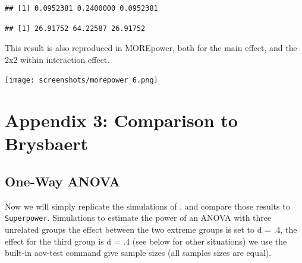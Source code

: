 \documentclass[
]{book}
\newenvironment{Shaded}{\begin{snugshade}}{\end{snugshade}}
\newcommand{\NormalTok}[1]{#1}
\newcommand{\SpecialCharTok}[1]{\textcolor[rgb]{0.00,0.00,0.00}{#1}}
\begin{document}
\begin{Shaded}
\end{Shaded}

\begin{verbatim}
## [1] 0.0952381 0.2400000 0.0952381
\end{verbatim}

\begin{Shaded}
\end{Shaded}

\begin{verbatim}
## [1] 26.91752 64.22587 26.91752
\end{verbatim}

This result is also reproduced in MOREpower, both for the main effect, and the 2x2 within interaction effect.

\texttt{[image: screenshots/morepower\_6.png]}

\hypertarget{appendix-3-comparison-to-brysbaert}{%
\chapter*{Appendix 3: Comparison to Brysbaert}\label{appendix-3-comparison-to-brysbaert}}

\hypertarget{one-way-anova-1}{%
\section{One-Way ANOVA}\label{one-way-anova-1}}

Now we will simply replicate the simulations of \citet{brysbaert2019many}, and compare those results to \texttt{Superpower}. Simulations to estimate the power of an ANOVA with three unrelated groups the effect between the two extreme groups is set to d = .4, the effect for the third group is d = .4 (see below for other situations) we use the built-in aov-test command give sample sizes (all samples sizes are equal).
\end{document}
